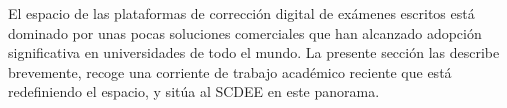 El espacio de las plataformas de corrección digital de exámenes escritos
está dominado por unas pocas soluciones comerciales que han alcanzado
adopción significativa en universidades de todo el mundo. La presente
sección las describe brevemente, recoge una corriente de trabajo académico
reciente que está redefiniendo el espacio, y sitúa al SCDEE en este
panorama.
